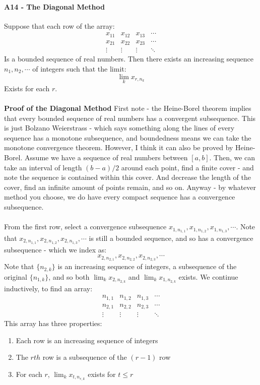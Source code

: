 \documentclass[12pt,a4paper]{article}
\newcommand{\1}[1]{\mathbbm{1}\left\{ #1 \right\}}
\begin{document}
\paragraph{A14 - The Diagonal Method} Suppose that each row of the array:
$$
	\begin{array}{cccc}
	x_{11} & x_{12} & x_{13} & \cdots\\
	x_{21} & x_{22} & x_{23} & \cdots\\
	\vdots & \vdots & \vdots & \ddots
	\end{array}
$$
Is a bounded sequence of real numbers. Then there exists an increasing sequence $n_1, n_2, \cdots$ of integers such that the limit:
$$
	\lim_k x_{r,n_k}
$$
Exists for each $r$.
\\\\
\textbf{Proof of the Diagonal Method} First note - the Heine-Borel theorem implies that every bounded sequence of real numbers has a convergent subsequence. This is just Bolzano Weierstrass - which says something along the lines of every sequence has a monotone subsequence, and boundedness means we can take the monotone convergence theorem. However, I think it can also be proved by Heine-Borel. Assume we have a sequence of real numbers between $[a,b]$. Then, we can take an interval of length $(b-a)/2$ around each point, find a finite cover - and note the sequence is contained within this cover. And decrease the length of the cover, find an infinite amount of points remain, and so on. Anyway - by whatever method you choose, we do have every compact sequence has a convergence subsequence.
\\\\
From the first row, select a convergence subsequence $x_{1,n_{1,1}}, x_{1,n_{1,2}}, x_{1,n_{1,3}}, \cdots$. Note that $x_{2,n_{1,1}}, x_{2,n_{1,2}}, x_{2,n_{1,3}}, \cdots$ is still a bounded sequence, and so has a convergence subsequence - which we index as:
$$
	x_{2,n_{2,1}}, x_{2,n_{2,2}}, x_{2,n_{2,3}}, \cdots
$$
Note that $\{n_{2,k}\}$ is an increasing sequence of integers, a subsequence of the original $\{n_{1,k}\}$, and so both $\lim_k x_{2,n_{2,k}}$ and $\lim_k x_{1,n_{2,k}}$ exists. We continue inductively, to find an array:
$$
	\begin{array}{cccc}
	n_{1,1} & n_{1,2} & n_{1,3} & \cdots\\
	n_{2,1} & n_{2,2} & n_{2,3} & \cdots\\
	\vdots & \vdots & \vdots & \ddots
	\end{array}
$$
This array has three properties:
\begin{enumerate}
	\item Each row is an increasing sequence of integers
	\item The $rth$ row is a subsequence of the $(r-1)$ row
	\item For each $r$, $\lim_k x_{t,n_{r,k}}$ exists for $t \leq r$
\end{enumerate}
\end{document}
